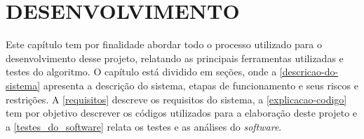 \chapter{\textbf{DESENVOLVIMENTO}}
\label{desenvolvimento}


Este capítulo tem por finalidade abordar todo o processo utilizado para o desenvolvimento desse projeto, relatando as principais ferramentas utilizadas e testes do algoritmo. O capítulo está dividido em seções, onde a \autoref{descricao-do-sistema} apresenta a descrição do sistema, etapas de funcionamento e seus riscos e restrições. A \autoref{requisitos} descreve os requisitos do sistema, a \autoref{explicacao-codigo} tem por objetivo descrever os códigos utilizados para a elaboração deste projeto e a \autoref{testes_do_software} relata os testes e as análises do \textit{software}.

%













%